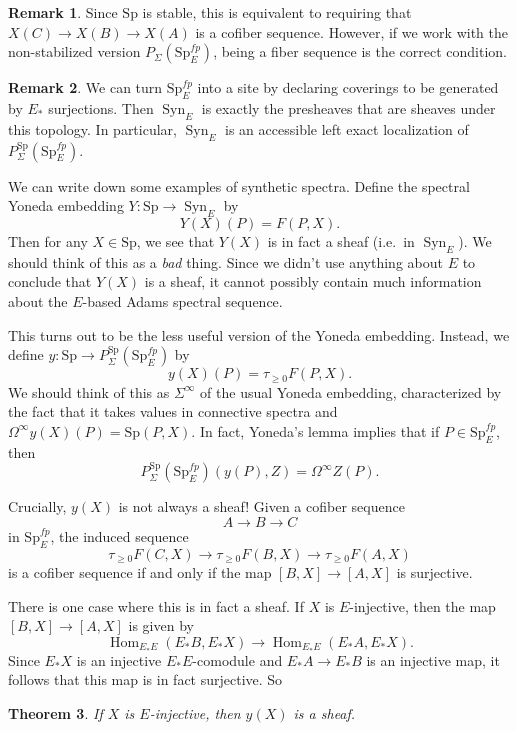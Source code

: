 \documentclass{shortart}
\newtheorem{thm}{Theorem}[section]
\theoremstyle{definition}
\newtheorem{remark}[thm]{Remark}
\newcommand\Sp{{\mathrm{Sp}}}
\DeclareMathOperator\Hom{Hom}
\DeclareMathOperator\Syn{Syn}
\begin{document}
\begin{remark}
  Since $\Sp$ is stable, this is equivalent to requiring that $X(C) \to X(B) \to X(A)$ is a cofiber sequence. However, if we work with the non-stabilized version $P_\Sigma(\Sp_E^{fp})$, being a fiber sequence is the correct condition.
\end{remark}
\begin{remark}
  We can turn $\Sp_E^{fp}$ into a site by declaring coverings to be generated by $E_*$ surjections. Then $\Syn_E$ is exactly the presheaves that are sheaves under this topology. In particular, $\Syn_E$ is an accessible left exact localization of $P_\Sigma^\Sp(\Sp_E^{fp})$.
\end{remark}

We can write down some examples of synthetic spectra. Define the spectral Yoneda embedding $Y \colon \Sp \to \Syn_E$ by
\[
  Y(X)(P) = F(P, X).
\]
Then for any $X \in \Sp$, we see that $Y(X)$ is in fact a sheaf (i.e.\ in $\Syn_E$). We should think of this as a \emph{bad} thing. Since we didn't use anything about $E$ to conclude that $Y(X)$ is a sheaf, it cannot possibly contain much information about the $E$-based Adams spectral sequence.

This turns out to be the less useful version of the Yoneda embedding. Instead, we define $y \colon \Sp \to P_\Sigma^\Sp(\Sp_E^{fp})$ by
\[
  y(X)(P) = \tau_{\geq 0} F(P, X).
\]
We should think of this as $\Sigma^\infty$ of the usual Yoneda embedding, characterized by the fact that it takes values in connective spectra and $\Omega^\infty y(X)(P) = \Sp(P, X)$. In fact, Yoneda's lemma implies that if $P \in \Sp_E^{fp}$, then
\[
  P_\Sigma^\Sp(\Sp_E^{fp})(y(P), Z) = \Omega^\infty Z(P).
\]

Crucially, $y(X)$ is not always a sheaf! Given a cofiber sequence
\[
  A \to B \to C
\]
in $\Sp_E^{fp}$, the induced sequence
\[
  \tau_{\geq 0}  F(C, X) \to \tau_{\geq 0} F(B, X) \to \tau_{\geq 0} F(A, X)
\]
is a cofiber sequence if and only if the map $[B, X] \to [A, X]$ is surjective.

There is one case where this is in fact a sheaf. If $X$ is $E$-injective, then the map $[B, X] \to [A, X]$ is given by
\[
  \Hom_{E_*E} (E_* B, E_* X) \to \Hom_{E_* E} (E_*A, E_* X).
\]
Since $E_* X$ is an injective $E_*E$-comodule and $E_* A \to E_*B$ is an injective map, it follows that this map is in fact surjective. So
\begin{thm}
  If $X$ is $E$-injective, then $y(X)$ is a sheaf.
\end{thm}
\end{document}
